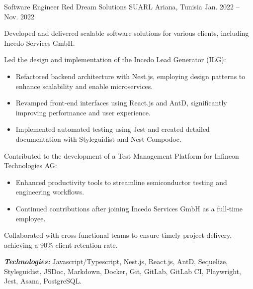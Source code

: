 \begin{cventries}
\cventry
{Software Engineer } %
{Red Dream Solutions SUARL} %
{Ariana, Tunisia} %
{Jan. 2022 – Nov. 2022} %
{
  \begin{cvitems} %
    \item {Developed and delivered scalable software solutions for various clients, including Incedo Services GmbH.}
    \item {Led the design and implementation of the Incedo Lead Generator (ILG):
    \begin{itemize}
      \item{Refactored backend architecture with Nest.js, employing design patterns to enhance scalability and enable microservices.}
      \item{Revamped front-end interfaces using React.js and AntD, significantly improving performance and user experience.}
      \item{Implemented automated testing using Jest and created detailed documentation with Styleguidist and Nest-Compodoc.}
    \end{itemize}
    }
    \item {Contributed to the development of a Test Management Platform for Infineon Technologies AG:
      \begin{itemize}
        \item{Enhanced productivity tools to streamline semiconductor testing and engineering workflows.}
        \item{Continued contributions after joining Incedo Services GmbH as a full-time employee.}
      \end{itemize}
    }
    \item {Collaborated with cross-functional teams to ensure timely project delivery, achieving a 90\% client retention rate.}
   \end{cvitems}
   \vspace{5mm}
  \textbf{\textit{Technologies:}} Javascript/Typescript, Nest.js, React.js, AntD, Sequelize, Styleguidist,
   JSDoc, Markdown, Docker, Git, GitLab, GitLab CI, Playwright, Jest, Asana, PostgreSQL.
  \vspace{5mm}
}



\end{cventries}
